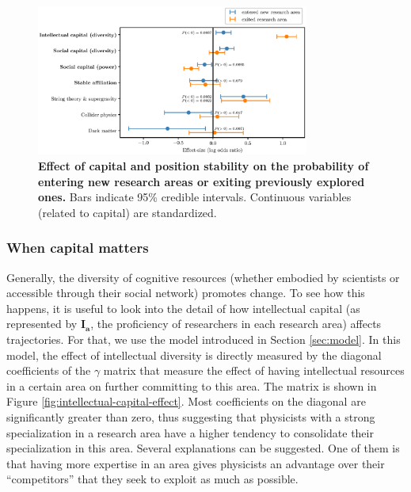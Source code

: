 \documentclass{article}
\begin{document}
\begin{figure}[h]
    \centering
    \includegraphics[width=0.8\textwidth]{plots/exited_score_effects_entropy.eps}
    \caption{\textbf{Effect of capital and position stability on the probability of entering new research areas or exiting previously explored ones.} Bars indicate 95\% credible intervals. Continuous variables (related to capital) are standardized.}
    \label{fig:diversification_score_effect}
\end{figure}


\subsubsection{When capital matters}

Generally, the diversity of cognitive resources (whether embodied by scientists or accessible through their social network) promotes change. To see how this happens, it is useful to look into the detail of how intellectual capital (as represented by $\bm{I_a}$, the proficiency of researchers in each research area) affects trajectories. For that, we use the model introduced in Section \ref{sec:model}. In this model, the effect of intellectual diversity is directly measured by the diagonal coefficients of the $\gamma$ matrix that measure the effect of having intellectual resources in a certain area on further committing to this area. The matrix is shown in Figure \ref{fig:intellectual-capital-effect}. Most coefficients on the diagonal are significantly greater than zero, thus suggesting that physicists with a strong specialization in a research area have a higher tendency to consolidate their specialization in this area. Several explanations can be suggested. One of them is that having more expertise in an area gives physicists an advantage over their ``competitors'' that they seek to exploit as much as possible.%
\end{document}
